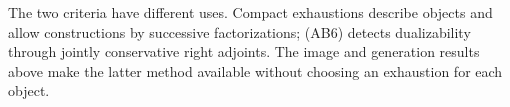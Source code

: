 	The two criteria have different uses. Compact exhaustions describe objects and allow constructions by successive factorizations; (AB6) detects dualizability through jointly conservative right adjoints. The image and generation results above make the latter method available without choosing an exhaustion for each object.
